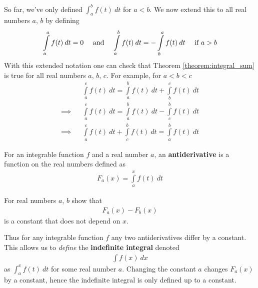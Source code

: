 So far, we've only defined $\int_a^b f(t) \: dt$ for $a < b$. We now extend this to all real numbers $a$, $b$ by defining
\begin{align*}
	\int \limits_a^a f(t) \:dt
	= 0
	 &  & \mbox{ and } &  &
	\int \limits_a^b f(t) \:dt
	= -\int \limits_b^a f(t) \:dt
	\mbox{ \quad if } a > b
\end{align*}
With this extended notation one can check that Theorem \ref{theorem:integral_sum} is true for all real numbers $a$, $b$, $c$. For example, for $ a < b < c$
\begin{align*}
	         &  &
	\int \limits_a ^c f(t) \: dt = \int \limits_a ^b f(t) \: dt  + \int \limits_b ^c f(t) \: dt \\
	\implies &  &
	\int \limits_a ^c f(t) \: dt = \int \limits_a ^b f(t) \: dt  - \int \limits_c ^b f(t) \: dt \\
	\implies &  &
	\int \limits_a ^c f(t) \: dt + \int \limits_c ^b f(t) \: dt = \int \limits_a ^b f(t) \: dt
\end{align*}


\begin{definition}
	For an integrable function $f$ and a real number $a$, an {\bf antiderivative} is a function on the real numbers defined as
	\begin{align*}
		F_a(x) = \int \limits_a^x f(t) \: dt
	\end{align*}
\end{definition}

\begin{exercise}
	\label{q:difference_antiderivatives}
	For real numbers $a$, $b$ show that
	\begin{align*}
		F_a(x) - F_b(x)
	\end{align*}
	is a constant that does not depend on $x$.
\end{exercise}

Thus for any integrable function $f$ any two antiderivatives differ by a constant. This allows us to {\it define} the {\bf indefinite integral} denoted
\begin{align*}
	\int f(x) \: dx
\end{align*}
as $\int_a^x f(t) \: dt$ for some real number $a$. Changing the constant $a$ changes $F_a(x)$ by a constant, hence the indefinite integral is only defined up to a constant.
